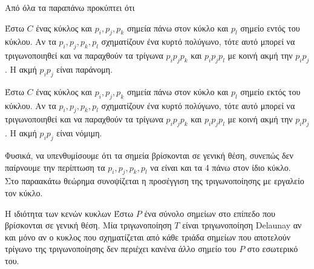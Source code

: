 \documentclass[oneside,12pt]{book}
\theoremstyle{definition}
\begin{document}
Από όλα τα παραπάνω προκύπτει ότι \\

\begin{mylemma}{}{}
	Έστω \(C\) ένας κύκλος και \(p_i, p_j, p_k\) σημεία πάνω στον κύκλο και \(p_l\) σημείο εντός του κύκλου. Αν τα \(p_i, p_j, p_k, p_l\) σχηματίζουν ένα κυρτό πολύγωνο, τότε αυτό μπορεί να τριγωνοποιηθεί και να παραχθούν τα τρίγωνα \(p_i p_j p_k\) και \(p_i p_j p_l\) με κοινή ακμή την \(p_i p_j\). Η ακμή \(p_i p_j\) είναι παράνομη.
\end{mylemma} 

\begin{mylemma}{}{}
	Έστω \(C\) ένας κύκλος και \(p_i, p_j, p_k\) σημεία πάνω στον κύκλο και \(p_l\) σημείο εκτός του κύκλου. Αν τα \(p_i, p_j, p_k, p_l\) σχηματίζουν ένα κυρτό πολύγωνο, τότε αυτό μπορεί να τριγωνοποιηθεί και να παραχθούν τα τρίγωνα \(p_i p_j p_k\) και \(p_i p_j p_l\) με κοινή ακμή την \(p_i p_j\). Η ακμή \(p_i p_j\) είναι νόμιμη.
\end{mylemma} 

Φυσικά, να υπενθυμίσουμε ότι τα σημεία βρίσκονται σε γενική θέση, συνεπώς δεν παίρνουμε την περίπτωση τα \(p_i, p_j, p_k, p_l\) να είναι και τα 4 πάνω στον ίδιο κύκλο. \\

Στο παραακάτω θεώρημα συνοψίζεται η προσέγγιση της τριγωνοποίησης με εργαλείο τον κύκλο. \\

\begin{mytheorem}{Η ιδιότητα των κενών κυκλων}{}
	Έστω \(P\) ένα σύνολο σημείων στο επίπεδο που βρίσκονται σε γενική θέση. Μία τριγωνοποίηση \(T\) είναι τριγωνοποίηση Delaunay αν και μόνο αν ο κυκλος που σχηματίζεται από κάθε τριάδα σημείων που αποτελούν τρίγωνο της τριγωνοποίησης δεν περιέχει κανένα άλλο σημείο του \(P\) στο εσωτερικό του.
\end{mytheorem} 
\end{document}
